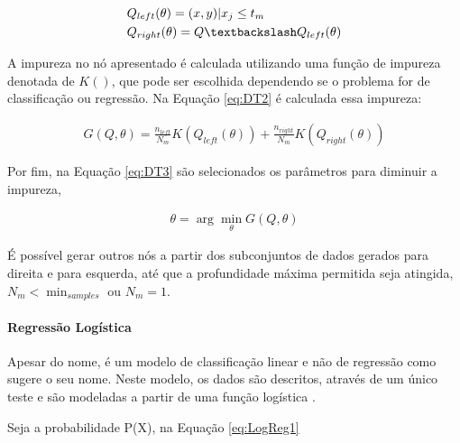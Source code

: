           \begin{equation}\label{eq:DT}
            \begin{aligned}
              & Q_{left}(\theta) = (x,y)|x_{j} \leq t_{m} \\
              & Q_{right}(\theta) = Q \textbackslash Q_{left}(\theta)
          \end{aligned}
          \end{equation}


          A impureza no nó apresentado é calculada utilizando uma função de impureza denotada de $K()$, que pode ser escolhida dependendo se o 
          problema for de classificação ou regressão. Na Equação \ref{eq:DT2} é calculada essa impureza:

          \begin{equation}\label{eq:DT2}
            \begin{aligned}
              G(Q,\theta) = \frac{n_{left}}{N_{m}}K(Q_{left}(\theta)) + \frac{n_{right}}{N_{m}}K(Q_{right}(\theta))
          \end{aligned}
          \end{equation}


          Por fim, na Equação \ref{eq:DT3} são selecionados os parâmetros para diminuir a impureza,

          \begin{equation}\label{eq:DT3}
            \begin{aligned}
              \theta = \arg\min_{\theta}G(Q,\theta)
          \end{aligned} 
          \end{equation}

          É possível gerar outros nós a partir dos subconjuntos de dados gerados para direita e para esquerda, 
          até que a profundidade máxima permitida seja atingida, $N_{m} < \min_{samples}$ ou $N_{m} = 1$.

        \paragraph{Regressão Logística}

          Apesar do nome, é um modelo de classificação linear e não de regressão como sugere o seu nome. Neste modelo, os dados
          são descritos, através de um único teste e são modeladas a partir de uma função logística \cite{nasrabadi2007pattern}.

          Seja a probabilidade P(X), na Equação \ref{eq:LogReg1}



